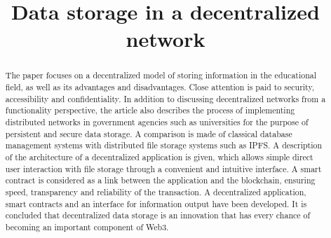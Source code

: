 \documentclass[10pt,conference,a4paper]{IEEEtran_EDM}
\def\confheader{}
\begin{document}
\markboth{\confheader}{}
\title{Data storage in a decentralized network}

\author{
\and
{}
\and
{}
\and
}

\maketitle


\begin{abstract}
The paper focuses on a decentralized model of storing information in the educational field, as well as its advantages and disadvantages.
Close attention is paid to security, accessibility and confidentiality.
In addition to discussing decentralized networks from a functionality perspective, the article also describes the process of implementing distributed networks in government agencies such as universities for the purpose of persistent and secure data storage.
A comparison is made of classical database management systems with distributed file storage systems such as IPFS.
A description of the architecture of a decentralized application is given, which allows simple direct user interaction with file storage through a convenient and intuitive interface.
A smart contract is considered as a link between the application and the blockchain, ensuring speed, transparency and reliability of the transaction.
A decentralized application, smart contracts and an interface for information output have been developed.
It is concluded that decentralized data storage is an innovation that has every chance of becoming an important component of Web3.

\end{abstract}
\end{document}
